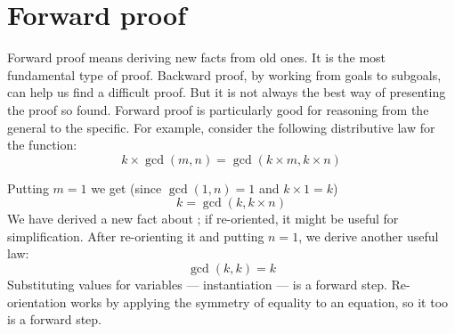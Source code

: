 \section{Forward proof}\label{sec:forward}

Forward proof means deriving new facts from old ones.  It is  the
most fundamental type of proof.  Backward proof, by working  from goals to
subgoals, can help us find a difficult proof.  But it is
not always the best way of presenting the proof so found.  Forward
proof is particularly good for reasoning from the general
to the specific.  For example, consider the following distributive law for
the 
 function:
\[ k\times\gcd(m,n) = \gcd(k\times m,k\times n)\]

Putting $m=1$ we get (since $\gcd(1,n)=1$ and $k\times1=k$) 
\[ k = \gcd(k,k\times n)\]
We have derived a new fact about ; if re-oriented, it might be
useful for simplification.  After re-orienting it and putting $n=1$, we
derive another useful law: 
\[ \gcd(k,k)=k \]
Substituting values for variables --- instantiation --- is a forward step. 
Re-orientation works by applying the symmetry of equality to 
an equation, so it too is a forward step.  

